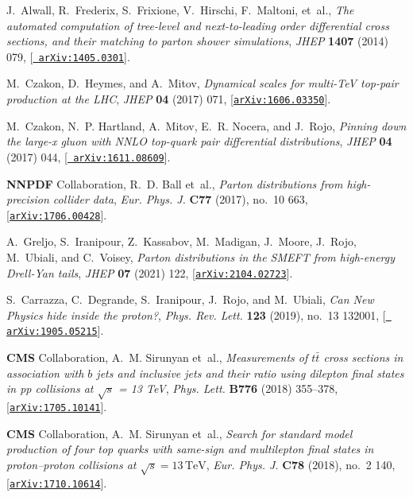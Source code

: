 \documentclass[11pt,a4paper]{article}
\numberwithin{equation}{section}
\numberwithin{figure}{section}
\numberwithin{table}{section}
\begin{document}
\begin{thebibliography}{100}
J.~Alwall, R.~Frederix, S.~Frixione, V.~Hirschi, F.~Maltoni, et~al., {\it {The
  automated computation of tree-level and next-to-leading order differential
  cross sections, and their matching to parton shower simulations}},  {\em
  JHEP} {\bf 1407} (2014) 079, [\href{http://arxiv.org/abs/1405.0301}{{\tt
  arXiv:1405.0301}}].

M.~Czakon, D.~Heymes, and A.~Mitov, {\it {Dynamical scales for multi-TeV
  top-pair production at the LHC}},  {\em JHEP} {\bf 04} (2017) 071,
  [\href{http://arxiv.org/abs/1606.03350}{{\tt arXiv:1606.03350}}].

M.~Czakon, N.~P. Hartland, A.~Mitov, E.~R. Nocera, and J.~Rojo, {\it {Pinning
  down the large-x gluon with NNLO top-quark pair differential distributions}},
   {\em JHEP} {\bf 04} (2017) 044, [\href{http://arxiv.org/abs/1611.08609}{{\tt
  arXiv:1611.08609}}].

{\bf NNPDF} Collaboration, R.~D. Ball et~al., {\it {Parton distributions from
  high-precision collider data}},  {\em Eur. Phys. J.} {\bf C77} (2017), no.~10
  663, [\href{http://arxiv.org/abs/1706.00428}{{\tt arXiv:1706.00428}}].

A.~Greljo, S.~Iranipour, Z.~Kassabov, M.~Madigan, J.~Moore, J.~Rojo, M.~Ubiali,
  and C.~Voisey, {\it {Parton distributions in the SMEFT from high-energy
  Drell-Yan tails}},  {\em JHEP} {\bf 07} (2021) 122,
  [\href{http://arxiv.org/abs/2104.02723}{{\tt arXiv:2104.02723}}].

S.~Carrazza, C.~Degrande, S.~Iranipour, J.~Rojo, and M.~Ubiali, {\it {Can New
  Physics hide inside the proton?}},  {\em Phys. Rev. Lett.} {\bf 123} (2019),
  no.~13 132001, [\href{http://arxiv.org/abs/1905.05215}{{\tt
  arXiv:1905.05215}}].

{\bf CMS} Collaboration, A.~M. Sirunyan et~al., {\it {Measurements of
  $t\bar{t}$ cross sections in association with $b$ jets and inclusive jets and
  their ratio using dilepton final states in pp collisions at $\sqrt{s}$ = 13
  TeV}},  {\em Phys. Lett.} {\bf B776} (2018) 355--378,
  [\href{http://arxiv.org/abs/1705.10141}{{\tt arXiv:1705.10141}}].

{\bf CMS} Collaboration, A.~M. Sirunyan et~al., {\it {Search for standard model
  production of four top quarks with same-sign and multilepton final states in
  proton--proton collisions at $\sqrt{s} = 13\,\text {TeV} $}},  {\em Eur.
  Phys. J.} {\bf C78} (2018), no.~2 140,
  [\href{http://arxiv.org/abs/1710.10614}{{\tt arXiv:1710.10614}}].


\end{thebibliography}
\end{document}
